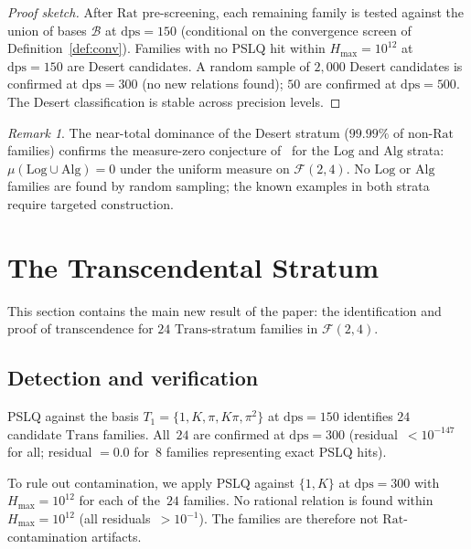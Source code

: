 \documentclass{amsart}
\theoremstyle{definition}
\theoremstyle{remark}
\newtheorem{remark}[theorem]{Remark}
\newcommand{\FF}{\mathcal{F}}
\newcommand{\Rat}{\mathrm{Rat}}
\newcommand{\Log}{\mathrm{Log}}
\newcommand{\Alg}{\mathrm{Alg}}
\newcommand{\Trans}{\mathrm{Trans}}
\newcommand{\dps}{\mathrm{dps}}
\begin{document}
\begin{proof}[Proof sketch]
After $\Rat$ pre-screening, each remaining family is tested against the
union of bases $\mathcal{B}$ at $\dps = 150$
(conditional on the convergence screen of Definition~\ref{def:conv}).
Families with no PSLQ hit within $H_{\max} = 10^{12}$ at $\dps = 150$
are Desert candidates.  A random sample of $2{,}000$ Desert candidates is
confirmed at $\dps = 300$ (no new relations found); $50$ are confirmed at
$\dps = 500$.  The Desert classification is stable across precision
levels.
\end{proof}

\begin{remark}\label{rem:desertdensity}
The near-total dominance of the Desert stratum ($99.99\%$ of non-$\Rat$
families) confirms the measure-zero conjecture of~\cite{synthesis} for
the $\Log$ and $\Alg$ strata:
$\mu(\Log \cup \Alg) = 0$ under the uniform measure on $\FF(2,4)$.
No $\Log$ or $\Alg$ families are found by random sampling; the known
examples in both strata require targeted construction.
\end{remark}

\section{The Transcendental Stratum}\label{sec:trans}

This section contains the main new result of the paper: the
identification and proof of transcendence for $24$ $\Trans$-stratum
families in $\FF(2,4)$.

\subsection{Detection and verification}\label{ss:detection}

PSLQ against the basis $T_1 = \{1, K, \pi, K\pi, \pi^2\}$ at
$\dps = 150$ identifies $24$ candidate $\Trans$ families.  All~$24$ are
confirmed at $\dps = 300$ (residual~$< 10^{-147}$ for all; residual $=
0.0$ for~$8$ families representing exact PSLQ hits).

To rule out contamination, we apply PSLQ against $\{1, K\}$ at
$\dps = 300$ with $H_{\max} = 10^{12}$ for each of the~$24$ families.
No rational relation is found within $H_{\max} = 10^{12}$
(all residuals~$> 10^{-1}$).  The families
are therefore not $\Rat$-contamination artifacts.
\end{document}
